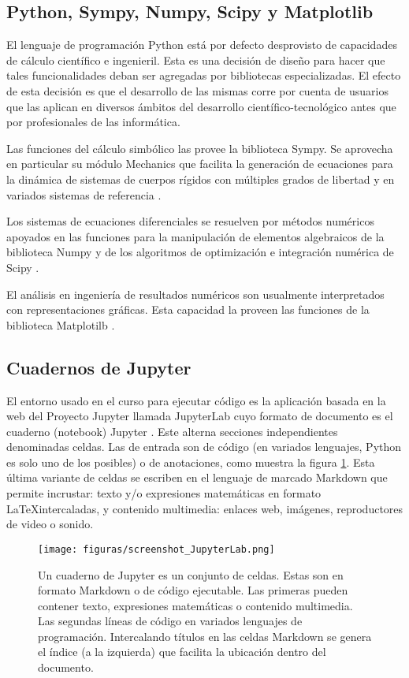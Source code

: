 \subsection{Python, Sympy, Numpy, Scipy y Matplotlib}

El lenguaje de programación Python está por defecto desprovisto de capacidades de cálculo científico e ingenieril.  Esta es una decisión de diseño para hacer que tales funcionalidades deban ser agregadas por bibliotecas especializadas. El efecto de esta decisión es que el desarrollo de las mismas corre por cuenta de usuarios que las aplican en diversos ámbitos del desarrollo científico-tecnológico antes que por profesionales de las informática.

Las funciones del cálculo simbólico las provee la biblioteca Sympy. Se aprovecha en particular su módulo Mechanics que facilita la generación de ecuaciones para la dinámica de sistemas de cuerpos rígidos con múltiples grados de libertad y en variados sistemas de referencia \cite{simpy}.

Los sistemas de ecuaciones diferenciales se resuelven por métodos numéricos apoyados en las funciones para la manipulación de elementos algebraicos de la biblioteca Numpy \cite{numpy} y de los algoritmos de optimización e integración numérica de Scipy \cite{SciPy}.

El análisis en ingeniería de resultados numéricos son usualmente interpretados con representaciones gráficas. Esta capacidad la proveen las funciones de la biblioteca Matplotilb \cite{matplotlib}.

\subsection{Cuadernos de Jupyter}

El entorno usado en el curso para ejecutar código es la aplicación basada en la web del Proyecto Jupyter llamada JupyterLab cuyo  formato de documento es el cuaderno (notebook) Jupyter \cite{Kluyver2016jupyter}. Este alterna secciones independientes denominadas celdas. Las de entrada son de código (en variados lenguajes, Python es solo uno de los posibles) o de  anotaciones, como muestra la figura \ref{fig:jupyter}. Esta última variante de celdas se escriben en el lenguaje de  marcado Markdown \cite{markdown} que permite incrustar: texto y/o expresiones matemáticas en formato \LaTeX intercaladas, y contenido multimedia: enlaces web, imágenes, reproductores de video o sonido.

\begin{figure}[!ht]
\centering
\texttt{[image: figuras/screenshot\_JupyterLab.png]}
\caption{Un cuaderno de Jupyter es un conjunto de celdas. Estas son en formato Markdown o de código ejecutable. Las primeras pueden contener texto,  expresiones  matemáticas o contenido multimedia. Las segundas líneas de código en variados lenguajes de programación. Intercalando títulos en las celdas Markdown se genera el índice (a la izquierda) que facilita la ubicación dentro del documento.}
\label{fig:jupyter}
\end{figure}

